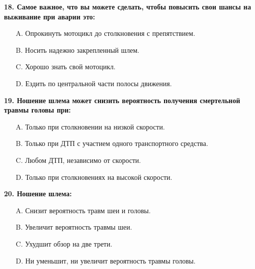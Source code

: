 \begin{minipage}{\linewidth}
\vspace{1em}\noindent\textbf{18. Самое важное, что вы можете сделать, чтобы повысить свои шансы на выживание при аварии это:}

\begin{itemize}[nosep,leftmargin=2em]
\item [A.] Опрокинуть мотоцикл до столкновения с препятствием.
\item [B.] Носить надежно закрепленный шлем.
\item [C.] Хорошо знать свой мотоцикл.
\item [D.] Ездить по центральной части полосы движения.

\end{itemize}
\end{minipage}


\begin{minipage}{\linewidth}
\vspace{1em}\noindent\textbf{19. Ношение шлема может снизить вероятность получения смертельной травмы головы при:}

\begin{itemize}[nosep,leftmargin=2em]
\item [A.] Только при столкновении на низкой скорости.
\item [B.] Только при ДТП с участием одного транспортного средства.
\item [C.] Любом ДТП, независимо от скорости.
\item [D.] Только при столкновениях на высокой скорости.

\end{itemize}
\end{minipage}


\begin{minipage}{\linewidth}
\vspace{1em}\noindent\textbf{20. Ношение шлема:}

\begin{itemize}[nosep,leftmargin=2em]
\item [A.] Снизит вероятность травм шеи и головы.
\item [B.] Увеличит вероятность травмы шеи.
\item [C.] Ухудшит обзор на две трети.
\item [D.] Ни уменьшит, ни увеличит вероятность травмы головы.

\end{itemize}
\end{minipage}



